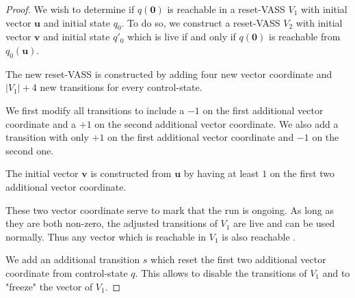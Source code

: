\begin{proof}


We wish to determine if $q(\textbf{0})$ is reachable in a reset-VASS $V_1$
with
initial vector $\textbf{u}$ and initial state $q_0$.
To do so, we construct a reset-VASS $V_2$
with initial vector $\textbf{v}$ and initial state $q'_0$ 
which is live if and only if 
$q(\textbf{0})$
is reachable from $q_0(\textbf{u})$.


The new reset-VASS is constructed by adding four new vector coordinate
and
$|V_1|+4$ new transitions for every control-state.

We first modify all transitions to include a $-1$ on the first additional vector coordinate and a $+1$ on the second additional vector coordinate. We also add a transition with only $+1$ on the first additional vector coordinate and $-1$ on the second one.



The initial vector $\textbf{v}$ is constructed from $\textbf{u}$ by having at least $1$ on the first two additional vector coordinate.


These two vector coordinate serve to mark that the run is ongoing. As long as they are both non-zero, the adjusted transitions of $V_1$ are live and can be used normally. Thus any vector which is reachable in $V_1$ is also reachable%
.



We add an additional transition $s$ which reset the first two additional vector coordinate from control-state $q$.
This allows to disable the transitions of $V_1$ and to "freeze" the vector of $V_1$.


\end{proof}
